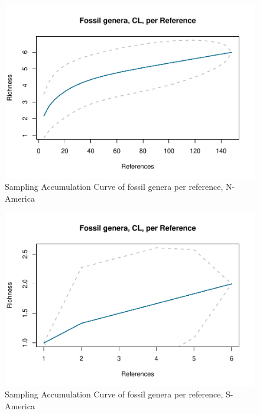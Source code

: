 \documentclass[]{article}
\begin{document}
\begin{figure}[htbp]
\centering
\includegraphics{MA_JJ_files/figure-latex/Species Accumulation Curve with Genera, N-America-1.pdf}
\caption{Sampling Accumulation Curve of fossil genera per reference,
N-America}
\end{figure}

\begin{figure}[htbp]
\centering
\includegraphics{MA_JJ_files/figure-latex/Species Accumulation Curve with Genera, S-America-1.pdf}
\caption{Sampling Accumulation Curve of fossil genera per reference,
S-America}
\end{figure}
\end{document}
